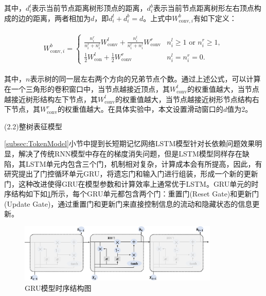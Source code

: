 其中，$d_{i}^{t}$表示当前节点距离树形顶点的距离，$d_{i}^{b}$表示当前节点距离树形左右顶点构成的边的距离，两者相加为$d$，即$d_{i}^{t} + d_{i}^{b} = d$。上式中$W_{\text{conv}, i}^{b}$有如下定义：

\begin{equation}\label{e4.3}
  \begin{split}
    \begin{array}{l}
      W_{\text{conv}, i}^{b}= 
      \left\{\begin{array}{ll}
      \frac{n_{i}^{r}}{n_{i}^{r}+n_{i}^{l}} W_{\text {conv}}^{l}+\frac{n_{i}^{l}}{n_{i}^{r}+n_{i}^{l}} W_{\text{conv}}^{r} & n_{i}^{l} \geq 1 \text { or } n_{i}^{r} \geq 1, \\
      \frac{1}{2} W_{\text{con}}^{l}+\frac{1}{2} W_{\text{conv}}^{r} & n_{i}^{l}=n_{i}^{r}=0 .
      \end{array}\right.
      \end{array}
  \end{split}
\end{equation}

其中，$n$表示树的同一层左右两个方向的兄弟节点个数。通过上述公式，可以计算在一个三角形的卷积窗口中，当节点越接近顶点，其$W_{\text{conv}}^{t}$的权重值越大，当节点越接近树形结构左下节点，其$W_{\text{conv}}^{l}$的权重值越大，当节点越接近树形节点结构右下节点，其$W_{\text{conv}}^{r}$的权重值越大。在具体实验中，本文设置滑动窗口的$d$值为2。

(2.2)整树表征模型

\ref{subsec:TokenModel}小节中提到长短期记忆网络LSTM模型针对长依赖问题效果明显，解决了传统RNN模型中存在的梯度消失问题，但是LSTM模型同样存在缺陷，其LSTM单元内包含三个门，机制相对复杂，计算成本会有所提高，因此，有研究提出了门控循环单元GRU，将遗忘门和输入门进行组装，形成一个新的更新门，这种改进使得GRU在模型参数和计算效率上通常优于LSTM。GRU单元的时序结构如下如\ref{fig:GRU}所示，每个GRU单元都包含两个门：重置门(Reset Gate)和更新门(Update Gate)，通过重置门和更新门来直接控制信息的流动和隐藏状态的信息更新。

\begin{figure}[H]
  \centering
  \includegraphics[width=0.85\textwidth]{figures/GRU.png}
  \caption{GRU模型时序结构图}\label{fig:GRU}
\end{figure}

